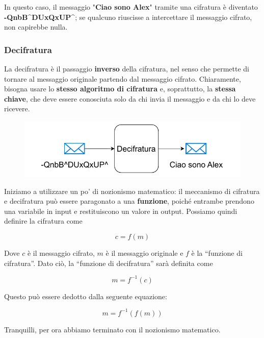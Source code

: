 \documentclass{report}
\begin{document}
In questo caso, il messaggio "\textbf{Ciao sono Alex}" tramite una cifratura è diventato \textbf{-QnbB\^{}DUxQxUP\^{}}; se qualcuno riuscisse a intercettare il messaggio cifrato, non capirebbe nulla.


\subsubsection{Decifratura} 

La decifratura è il passaggio \textbf{inverso} della cifratura, nel senso che permette di tornare al messaggio originale partendo dal messaggio cifrato. Chiaramente, bisogna usare lo \textbf{stesso algoritmo di cifratura} e, soprattutto, la \textbf{stessa chiave}, che deve essere conosciuta solo da chi invia il messaggio e da chi lo deve ricevere.


\begin{figure}[h]
     \centering
    \includegraphics[width=0.8\linewidth]{logos/cripto3.pdf}
\end{figure}


Iniziamo a utilizzare un po' di nozionismo matematico: il meccanismo di cifratura e decifratura può essere paragonato a una \textbf{funzione}, poiché entrambe prendono una variabile in input e restituiscono un valore in output. Possiamo quindi definire la cifratura come


\begin{equation*}
    c = f(m)
\end{equation*}

Dove $c$ è il messaggio cifrato, $m$ è il messaggio originale e $f$ è la “funzione di cifratura”. Dato ciò, la “funzione di decifratura” sarà definita come


\begin{equation*}
    m = f^{-1}(c)
\end{equation*}

Questo può essere dedotto dalla seguente equazione:


\begin{equation*}
    m = f^{-1}(f(m)) 
\end{equation*}

Tranquilli, per ora abbiamo terminato con il nozionismo matematico.
\end{document}
